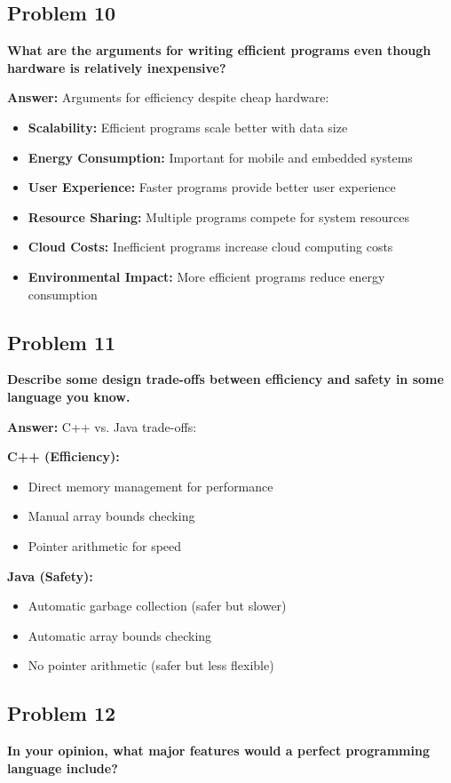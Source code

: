 \documentclass[11pt,a4paper]{article}
\begin{document}
\subsection{Problem 10}
\textbf{What are the arguments for writing efficient programs even though hardware is relatively inexpensive?}

\textbf{Answer:}
Arguments for efficiency despite cheap hardware:

\begin{itemize}
\item \textbf{Scalability:} Efficient programs scale better with data size
\item \textbf{Energy Consumption:} Important for mobile and embedded systems
\item \textbf{User Experience:} Faster programs provide better user experience
\item \textbf{Resource Sharing:} Multiple programs compete for system resources
\item \textbf{Cloud Costs:} Inefficient programs increase cloud computing costs
\item \textbf{Environmental Impact:} More efficient programs reduce energy consumption
\end{itemize}

\subsection{Problem 11}
\textbf{Describe some design trade-offs between efficiency and safety in some language you know.}

\textbf{Answer:}
C++ vs. Java trade-offs:

\textbf{C++ (Efficiency):}
\begin{itemize}
\item Direct memory management for performance
\item Manual array bounds checking
\item Pointer arithmetic for speed
\end{itemize}

\textbf{Java (Safety):}
\begin{itemize}
\item Automatic garbage collection (safer but slower)
\item Automatic array bounds checking
\item No pointer arithmetic (safer but less flexible)
\end{itemize}

\subsection{Problem 12}
\textbf{In your opinion, what major features would a perfect programming language include?}
\end{document}
